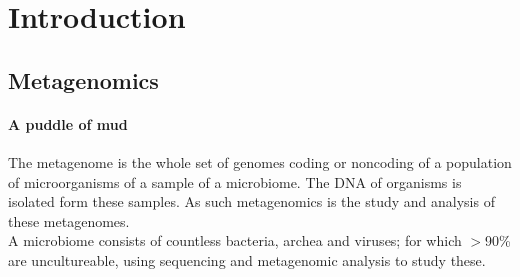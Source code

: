 \documentclass[twocolumn]{bmcart}%
\begin{document}

\section*{Introduction}
\subsection*{Metagenomics}
\paragraph*{A puddle of mud}
The metagenome is the whole set of genomes coding or noncoding of a population of microorganisms of a sample of a microbiome. The DNA of organisms is isolated form these samples. As such metagenomics is the study and analysis of these metagenomes\cite{handelsman2004metagenomics}.\\
A microbiome consists of countless bacteria, archea and viruses; for which $>$90\% are uncultureable, using sequencing and metagenomic analysis to study these.

\end{document}
